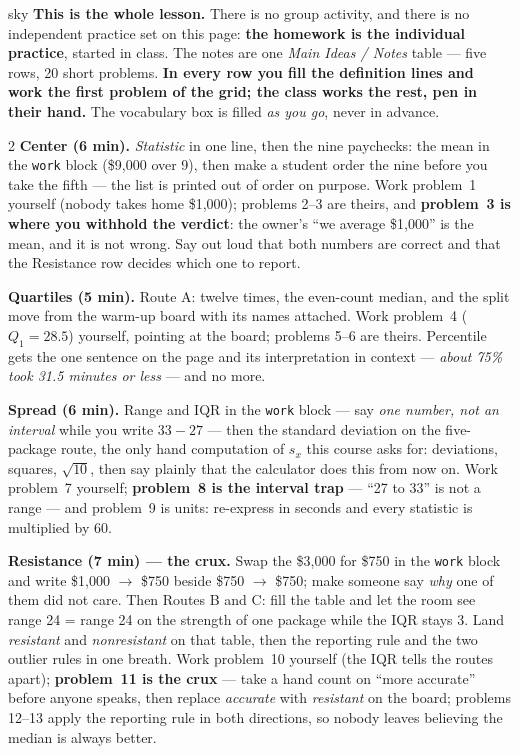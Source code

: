 \documentclass[10pt]{article}
\begin{document}
\boxguard
\begin{skillbox}{sky}
\textbf{This is the whole lesson.} There is no group activity, and there is no independent
practice set on this page: \textbf{the homework is the individual practice}, started in class.
The notes are one \emph{Main Ideas / Notes} table --- five rows, 20 short problems. \textbf{In
every row you fill the definition lines and work the first problem of the grid; the class works
the rest, pen in their hand.} The vocabulary box is filled \emph{as you go}, never in advance.
\begin{multicols}{2}
\textbf{Center (6 min).} \emph{Statistic} in one line, then the nine paychecks: the mean in the
\texttt{work} block (\$9{,}000 over 9), then make a student order the nine before you take the
fifth --- the list is printed out of order on purpose. Work problem~1 yourself (nobody takes home
\$1{,}000); problems 2--3 are theirs, and \textbf{problem~3 is where you withhold the verdict}:
the owner's ``we average \$1{,}000'' is the mean, and it is not wrong. Say out loud that both
numbers are correct and that the Resistance row decides which one to report.

\textbf{Quartiles (5 min).} Route A: twelve times, the even-count median, and the split move from
the warm-up board with its names attached. Work problem~4 ($Q_1 = 28.5$) yourself, pointing at the
board; problems 5--6 are theirs. Percentile gets the one sentence on the page and its
interpretation in context --- \emph{about 75\% took 31.5 minutes or less} --- and no more.

\textbf{Spread (6 min).} Range and IQR in the \texttt{work} block --- say \emph{one number, not an
interval} while you write $33 - 27$ --- then the standard deviation on the five-package route, the
only hand computation of $s_x$ this course asks for: deviations, squares, $\sqrt{10}$, then say
plainly that the calculator does this from now on. Work problem~7 yourself; \textbf{problem~8 is
the interval trap} --- ``27 to 33'' is not a range --- and problem~9 is units: re-express in
seconds and every statistic is multiplied by 60.

\textbf{Resistance (7 min) --- the crux.} Swap the \$3{,}000 for \$750 in the \texttt{work} block
and write \$1{,}000 $\to$ \$750 beside \$750 $\to$ \$750; make someone say \emph{why} one of them
did not care. Then Routes B and C: fill the table and let the room see range 24 = range 24 on the
strength of one package while the IQR stays 3. Land \emph{resistant} and \emph{nonresistant} on
that table, then the reporting rule and the two outlier rules in one breath. Work problem~10
yourself (the IQR tells the routes apart); \textbf{problem~11 is the crux} --- take a hand count
on ``more accurate'' before anyone speaks, then replace \emph{accurate} with \emph{resistant} on
the board; problems 12--13 apply the reporting rule in both directions, so nobody leaves
believing the median is always better.


\end{multicols}
\end{skillbox}
\end{document}
